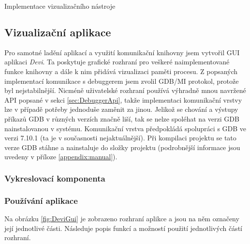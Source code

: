 \documentclass[bc,male,python,dept460]{diploma}						%
\begin{document}
\begin{section}{Implementace vizualizačního nástroje}
\begin{description}
		\end{description}
			
	\subsection{Vizualizační aplikace}
	Pro samotné ladění aplikací a využití komunikační knihovny jsem vytvořil GUI aplikaci \textit{Devi}.
	Ta poskytuje grafické rozhraní pro veškeré naimplementované funkce knihovny a dále k nim přidává vizualizaci paměti procesu.
	Z popsaných implementací komunikace s debuggerem jsem zvolil GDB/MI protokol, protože byl nejstabilnější. Nicméně uživatelské rozhraní používá výhradně
	mnou navržené API popsané v sekci \ref{sec:DebuggerApi}, takže implementaci komunikační vrstvy lze v případě potřeby jednoduše zaměnit za jinou.
	Jelikož se chování a výstupy příkazů GDB v různých verzích značně liší, tak se nelze spoléhat na verzi GDB nainstalovanou v systému.
	Komunikační vrstva předpokládá spolupráci s GDB ve verzi 7.10.1 (ta je v současnosti nejaktuálnější). Při kompilaci projektu se tato verze GDB stáhne a
	nainstaluje do složky projektu (podrobnější informace jsou uvedeny v příloze \ref{appendix:manual}).
	
	
	\subsubsection{Vykreslovací komponenta}
	
	\subsubsection{Používání aplikace}
	Na obrázku \ref{fig:DeviGui} je zobrazeno rozhraní aplikce a jsou na něm označeny její jednotlivé části. Následuje popis funkcí a možností použití
	jednotlivých částí rozhraní.
	
	

\end{section}
\end{document}
